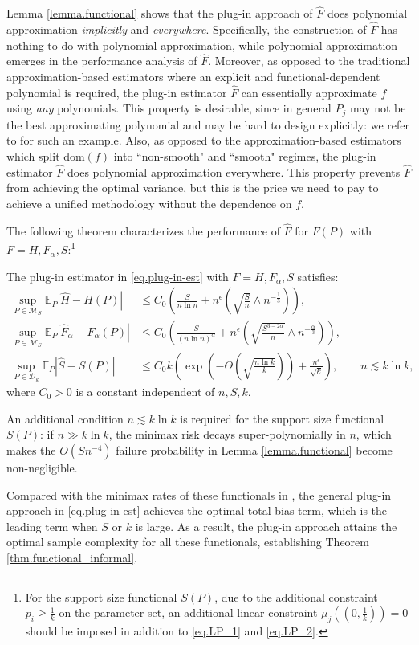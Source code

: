 \documentclass[final,12pt]{colt2018} %
\def \bE {\mathbb{E}}
\newcommand{\calD}{{\mathcal{D}}}
\newcommand{\calM}{{\mathcal{M}}}
\begin{document}
Lemma \ref{lemma.functional} shows that the plug-in approach of $\hat{F}$ does polynomial approximation \emph{implicitly} and \emph{everywhere}. Specifically, the construction of $\hat{F}$ has nothing to do with polynomial approximation, while polynomial approximation emerges in the performance analysis of $\hat{F}$. Moreover, as opposed to the traditional approximation-based estimators where an explicit and functional-dependent polynomial is required, the plug-in estimator $\hat{F}$ can essentially approximate $f$ using \emph{any} polynomials. This property is desirable, since in general $P_j$ may not be the best approximating polynomial and may be hard to design explicitly: we refer to \cite{jiao2017minimax} for such an example. Also, as opposed to the approximation-based estimators which split $\text{dom}(f)$ into ``non-smooth" and ``smooth" regimes, the plug-in estimator $\hat{F}$ does polynomial approximation everywhere. This property prevents $\hat{F}$ from achieving the optimal variance, but this is the price we need to pay to achieve a unified methodology without the dependence on $f$.

The following theorem characterizes the performance of $\hat{F}$ for $F(P)$ with $F=H,F_\alpha,S$:\footnote{For the support size functional $S(P)$, due to the additional constraint $p_i\ge \frac{1}{k}$ on the parameter set, an additional linear constraint $\mu_j((0,\frac{1}{k}))=0$ should be imposed in addition to \eqref{eq.LP_1} and \eqref{eq.LP_2}.}
\begin{theorem}\label{thm.functional}
	The plug-in estimator in \eqref{eq.plug-in-est} with $F=H, F_\alpha, S$ satisfies:
	\begin{align*}
	\sup_{P\in\calM_S} \bE_P|\hat{H}-H(P)| &\le C_0\left(\frac{S}{n\ln n} + n^{\epsilon}\left(\sqrt{\frac{S}{n}}\wedge n^{-\frac{1}{3}}\right)\right), \\
	\sup_{P\in\calM_S} \bE_P|\hat{F}_\alpha-F_\alpha(P)| &\le C_0\left(\frac{S}{(n\ln n)^\alpha} + n^{\epsilon}\left(\sqrt{\frac{S^{3-2\alpha}}{n}}\wedge n^{-\frac{\alpha}{3}}\right)\right),\\
	\sup_{P\in\calD_k} \bE_P|\hat{S}-S(P)| &\le C_0k\left(\exp\left(-\Theta\left(\sqrt{\frac{n\ln k}{k}}\right)\right) + \frac{n^{\epsilon}}{\sqrt{k}}\right),\qquad n\lesssim k\ln k,
	\end{align*}
	where $C_0>0$ is a constant independent of $n,S,k$.
\end{theorem}
\begin{remark}
	An additional condition $n\lesssim k\ln k$ is required for the support size functional $S(P)$: if $n\gg k\ln k$, the minimax risk decays super-polynomially in $n$, which makes the $O(Sn^{-4})$ failure probability in Lemma \ref{lemma.functional} become non-negligible.
\end{remark}
Compared with the minimax rates of these functionals in \cite{wu2016minimax,Jiao--Venkat--Han--Weissman2015minimax,wu2015chebyshev}, the general plug-in approach in \eqref{eq.plug-in-est} achieves the optimal total bias term, which is the leading term when $S$ or $k$ is large. As a result, the plug-in approach attains the optimal sample complexity for all these functionals, establishing Theorem \ref{thm.functional_informal}.
\end{document}
